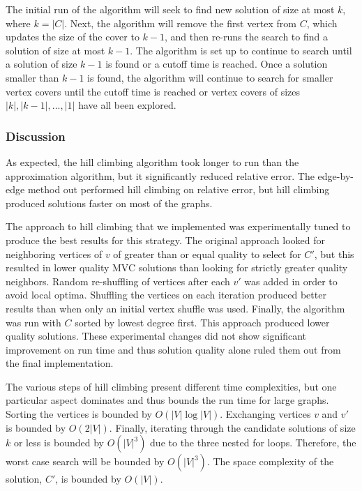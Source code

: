 \documentclass{sig-alternate-05-2015}
\begin{document}
\par
The initial run of the algorithm will seek to find new solution of size at most $k$, where $k=|C|$.  Next, the algorithm will remove the first vertex from $C$, which updates the size of the cover to $k-1$, and then re-runs the search to find a solution of size at most $k-1$. The algorithm is set up to continue to search until a solution of size $k-1$ is found or a cutoff time is reached.  Once a solution smaller than $k-1$ is found, the algorithm will continue to search for smaller vertex covers until the cutoff time is reached or vertex covers of sizes $|k|, |k-1|,...,|1|$ have all been explored.
\par
\subsubsection{Discussion}
As expected, the hill climbing algorithm took longer to run than the approximation algorithm, but it significantly reduced relative error.  The edge-by-edge method out performed hill climbing on relative error, but hill climbing produced solutions faster on most of the graphs.
\par
The approach to hill climbing that we implemented was experimentally tuned to produce the best results for this strategy.  The original approach looked for neighboring vertices of $v$ of greater than or equal quality to select for $C'$, but this resulted in lower quality MVC solutions than looking for strictly greater quality neighbors.  Random re-shuffling of vertices after each $v'$ was added in order to avoid local optima. Shuffling the vertices on each iteration produced better results than when only an initial vertex shuffle was used.  Finally, the algorithm was run with $C$ sorted by lowest degree first. This approach produced lower quality solutions.  These experimental changes did not show significant improvement on run time and thus solution quality alone ruled them out from the final implementation.
\par
The various steps of hill climbing present different time complexities, but one particular aspect dominates and thus bounds the run time for large graphs.  Sorting the vertices is bounded by $O(|V|\log|V|)$.  Exchanging vertices $v$ and $v'$ is bounded by $O(2|V|)$.  Finally, iterating through the candidate solutions of size $k$ or less is bounded by $O(|V|^{3})$ due to the three nested for loops. Therefore, the worst case search will be bounded by $O(|V|^{3})$.  The space complexity of the solution, $C'$, is bounded by $O(|V|)$.
\end{document}
